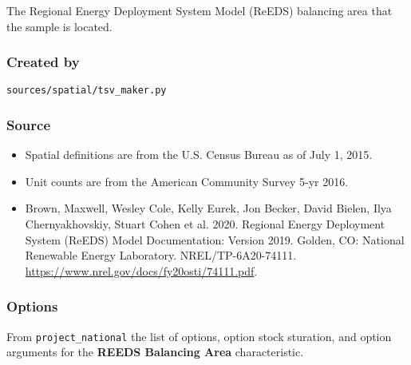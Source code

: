 The Regional Energy Deployment System Model (ReEDS) balancing area that
the sample is located.

\subsubsection{Created by}\label{created-by-132}

\texttt{sources/spatial/tsv\_maker.py}

\subsubsection{Source}\label{source-134}

\begin{itemize}
 
\item
  Spatial definitions are from the U.S. Census Bureau as of July 1,
  2015.
\item
  Unit counts are from the American Community Survey 5-yr 2016.
\item
  Brown, Maxwell, Wesley Cole, Kelly Eurek, Jon Becker, David Bielen,
  Ilya Chernyakhovskiy, Stuart Cohen et al. 2020. Regional Energy
  Deployment System (ReEDS) Model Documentation: Version 2019. Golden,
  CO: National Renewable Energy Laboratory. NREL/TP-6A20-74111.
  \url{https://www.nrel.gov/docs/fy20osti/74111.pdf}.
\end{itemize}

\subsubsection{Options}\label{options-135}

From \texttt{project\_national} the list of options, option stock
sturation, and option arguments for the \textbf{REEDS Balancing Area}
characteristic.

